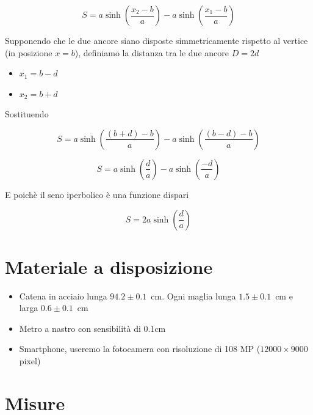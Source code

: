 \documentclass[a4paper,12pt]{article}
\begin{document}
\[ S = a \sinh \left( \dfrac{x_2-b}{a} \right) - a \sinh \left( \dfrac{x_1-b}{a} \right) \]

Supponendo che le due ancore siano disposte simmetricamente rispetto al vertice (in posizione $x = b$), definiamo la distanza tra le due ancore $D = 2d$
\begin{itemize}
    \item $x_1 = b-d$
    \item $x_2 = b+d$
\end{itemize}
Sostituendo

\[ S = a \sinh \left( \dfrac{(b+d)-b}{a} \right) - a \sinh \left( \dfrac{(b-d)-b}{a} \right)\]

\[ S = a \sinh \left( \dfrac{d}{a} \right) - a \sinh \left( \dfrac{-d}{a} \right)\]

E poichè il seno iperbolico è una funzione dispari

\begin{equation}
    S = 2a \sinh \left( \dfrac{d}{a} \right)
    \label{eq:dist_px}
\end{equation}

\section{Materiale a disposizione}

\begin{itemize}
    \item Catena in acciaio lunga $94.2 \pm 0.1$~cm. Ogni maglia  lunga $1.5\pm0.1$~cm e larga $0.6\pm0.1$~cm
    \item Metro a nastro con sensibilità di 0.1cm
    \item Smartphone, useremo la fotocamera con risoluzione di 108 MP ($12000 \times 9000$ pixel)
\end{itemize} 

\section{Misure}
\end{document}
